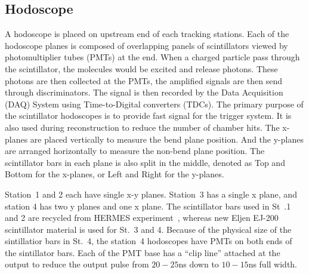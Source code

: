 \documentclass[../main.tex]{subfiles}
\begin{document}
\subsection{Hodoscope}
A hodoscope is placed on upstream end of each tracking stations. Each of the hodoscope planes
is composed of overlapping panels of scintillators viewed by photomultiplier tubes (PMTs) at the end.
When a charged particle pass through the scintillator, the molecules would be excited and
release photons. These photons are then collected at the PMTs, the amplified signals are
then send through discriminators. The signal is then recorded by the Data Acquisition (DAQ) System
using Time-to-Digital converters (TDCs).
The primary purpose of the scintillator hodoscopes is to provide fast signal for the
trigger system. It is also used during reconstruction to reduce the number of chamber hits.
The x-planes are placed vertically to measure the bend plane position.
And the y-planes are arranged horizontally to measure the non-bend plane position.
The scintillator bars in each plane is also split in the middle, denoted as Top and Bottom
for the x-planes, or Left and Right for the y-planes.

Station~1 and 2 each have single x-y planes. Station~3 has a single x plane, and station
4 has two y planes and one x plane. The scintillator bars used in St~.1 and 2 are recycled
from HERMES experiment~\cite{ackerstaff1998a}, whereas new Eljen EJ-200 scintillator material
is used for St.~3 and 4. Because of the physical size of the sintillatior bars in St.~4, the station~4
hodoscopes have PMTs on both ends of the sintillator bars. Each of the PMT base has a
``clip line'' attached at the output to reduce the output pulse from $20-25$\unit{\ns}
down to $10-15$\unit{\ns} full width.
\end{document}
